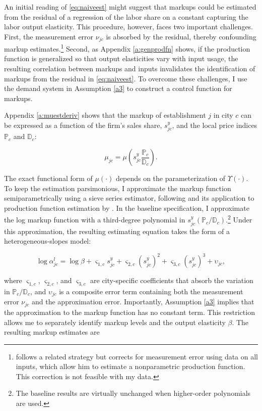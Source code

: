 An initial reading of \eqref{eq:naiveest} might suggest that markups could be estimated from the residual of a regression of the labor share on a constant capturing the labor output elasticity. This procedure, however, faces two important challenges. First, the measurement error $\nu_{jc}$ is absorbed by the residual, thereby confounding markup estimates.\footnote{\textcite{Peters20} follows a related strategy but corrects for measurement error using data on all inputs, which allow him to estimate a nonparametric production function. This correction is not feasible with my data.} Second, as Appendix \ref{a:genprodfn} shows, if the production function is generalized so that output elasticities vary with input usage, the resulting correlation between markups and inputs invalidates the identification of markups from the residual in \eqref{eq:naiveest}. To overcome these challenges, I use the demand system in Assumption \ref{a3} to construct a control function for markups.

Appendix \ref{a:muestderiv} shows that the markup of establishment $j$ in city $c$ can be expressed as a function of the firm’s sales share, $s^y_{jc}$, and the local price indices $\mathbb{P}_c$ and $\mathbb{D}_c$:

\begin{equation}\label{eq:mufunct}
\mu_{jc} = \mu\left(s^y_{jc} \frac{\mathbb{P}_c}{\mathbb{D}_c}\right).
\end{equation}

The exact functional form of $\mu(\cdot)$ depends on the parameterization of $\Upsilon(\cdot)$. To keep the estimation parsimonious, I approximate the markup function semiparametrically using a sieve series estimator, following \textcite{Hansen14} and its application to production function estimation by \textcite{GandhiNavarro&Rivers20}. In the baseline specification, I approximate the log markup function with a third-degree polynomial in $s^y_{jc}(\mathbb{P}_c/\mathbb{D}_c)$.\footnote{The baseline results are virtually unchanged when higher-order polynomials are used.} Under this approximation, the resulting estimating equation takes the form of a heterogeneous-slopes model:

\begin{equation}\label{eq:estequ}
\log \alpha_{jc}^l = \log \beta + \varsigma_{1,c} s^y_{jc} + \varsigma_{2,c} (s^y_{jc})^2 + \varsigma_{3,c} (s^y_{jc})^3 +  \upsilon_{jc},
\end{equation}

where $\varsigma_{1,c}$, $\varsigma_{2,c}$, and $\varsigma_{3,c}$ are city-specific coefficients that absorb the variation in $\mathbb{P}_c/\mathbb{D}_c$, and $\upsilon_{jc}$ is a composite error term containing both the measurement error $\nu_{jc}$ and the approximation error. Importantly, Assumption \ref{a3} implies that the approximation to the markup function has no constant term. This restriction allows me to separately identify markup levels and the output elasticity $\beta$. The resulting markup estimates are

